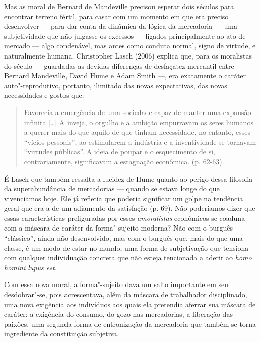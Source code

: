 Mas as moral de Bernard de Mandeville precisou esperar dois séculos para
encontrar terreno fértil, para casar com um momento em que era preciso
desenvolver --- para dar conta da dinâmica da lógica da mercadoria ---
uma subjetividade que não julgasse os excessos --- ligados
principalmente ao ato de mercado --- algo condenável, mas antes como
conduta normal, signo de virtude, e naturalmente humana. Christopher
Lasch (2006) explica que, para os moralistas do século  ---
guardadas as devidas diferenças de desfaçatez mercantil entre Bernard
Mandeville, David Hume e Adam Smith ---, era exatamente o caráter
auto"-reprodutivo, portanto, ilimitado das novas expectativas, das novas
necessidades e gostos que:

\begin{quote}
Favorecia a emergência de uma sociedade capaz de manter uma expansão
infinita [\ldots{}] A inveja, o orgulho e a ambição empurravam os seres
humanos a querer mais do que aquilo de que tinham necessidade, no
entanto, esses ``vícios pessoais'', ao estimularem a indústria e a
inventividade se tornavam ``virtudes públicas''. A ideia de poupar e o
esquecimento de si, contrariamente, significavam a estagnação econômica.
(p. 62-63).
\end{quote}

É Lasch que também ressalta a lucidez de Hume quanto ao perigo dessa
filosofia da superabundância de mercadorias --- quando se estava longe
do que vivenciamos hoje. Ele já refletia que poderia significar um golpe
na tendência geral que era a de um adiamento da satisfação (p. 69). Não
poderíamos dizer que essas características prefiguradas por esses
\emph{amoralistas} econômicos se coaduna com a máscara de caráter da
forma"-sujeito moderna? Não com o burguês ``clássico'', ainda não
desenvolvido, mas com o burguês que, mais do que uma classe, é um modo
de estar no mundo, uma forma de subjetivação que tensiona com qualquer
individuação concreta que não esteja tencionada a aderir ao \emph{homo
homini lupus est.}

Com essa nova moral, a forma"-sujeito dava um salto importante em seu
desdobrar"-se, pois acrescentava, além da máscara de trabalhador
disciplinado, uma nova exigência aos indivíduos aos quais ela pretendia
aferrar sua máscara de caráter: a exigência do consumo, do gozo nas
mercadorias, a liberação das paixões, uma segunda forma de entronização
da mercadoria que também se torna ingrediente da constituição subjetiva.

